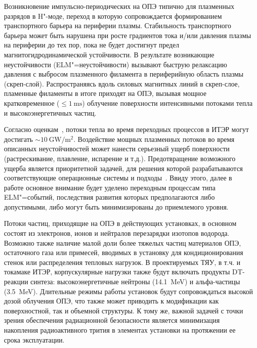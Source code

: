 Возникновение импульсно-периодических  на ОПЭ типично для плазменных разрядов в H"-моде, переход в которую сопровождается формированием транспортного барьера на периферии плазмы. Стабильность транспортного барьера может быть нарушена при росте градиентов тока и/или давления плазмы на периферии до тех пор, пока не будет достигнут предел магнитогидродинамической устойчивости. В результате возникающие неустойчивости (ELM"=неустойчивости) вызывают быструю релаксацию давления с выбросом плазменного филамента в периферийную область плазмы (скреп-слой). Распространяясь вдоль силовых магнитных линий в скреп-слое, пламенные филаменты в итоге приходят на ОПЭ, вызывая мощное кратковременное (\( \leq \SI{1}{\milli\second} \)) облучение поверхности интенсивными потоками тепла и высокоэнергетичных частиц.  

Согласно оценкам~\cite{Loarte2003, hender2007mhd, Pitts2017, Pitts2019}, потоки тепла во время переходных процессов в ИТЭР могут достигать $\sim\SI{10}{\giga\watt\per\meter\squared}$. Воздействие мощных плазменных потоков во время описанных неустойчивостей может нанести серьезный ущерб поверхности (растрескивание, плавление, испарение и т.д.). Предотвращение возможного ущерба является приоритетной задачей, для решения которой разрабатываются соответствующие операционные системы и подходы~\cite{Lang2013,Evans2013,Lehnen2015}. Ввиду этого, далее в работе основное внимание будет уделено переходным процессам типа ELM"=событий, последствия развития которых предполагаются либо допустимыми, либо могут быть минимизированы до приемлемого уровня.

Потоки частиц, приходящие на ОПЭ в действующих установках, в основном состоят из электронов, ионов и нейтралов перезарядки изотопов водорода. Возможно также наличие малой доли более тяжелых частиц материалов ОПЭ, остаточного газа или примесей, вводимых в установку для кондиционирования стенок или распределения тепловых нагрузок. В проектируемых ТЯУ, в т.ч. и токамаке ИТЭР, корпускулярные нагрузки также будут включать продукты DT-реакции синтеза: высокоэнергетичные нейтроны (\SI{14.1}{\mega\electronvolt}) и альфа-частицы (\SI{3.5}{\mega\electronvolt}). Длительные режимы работы установок будут сопровождаться высокой дозой облучения ОПЭ, что также может приводить к модификации как поверхностной, так и объемной структуры. К тому же, важной задачей с точки зрения обеспечения радиационной безопасности является минимизация накопления радиоактивного трития в элементах установки на протяжении ее срока эксплуатации.

